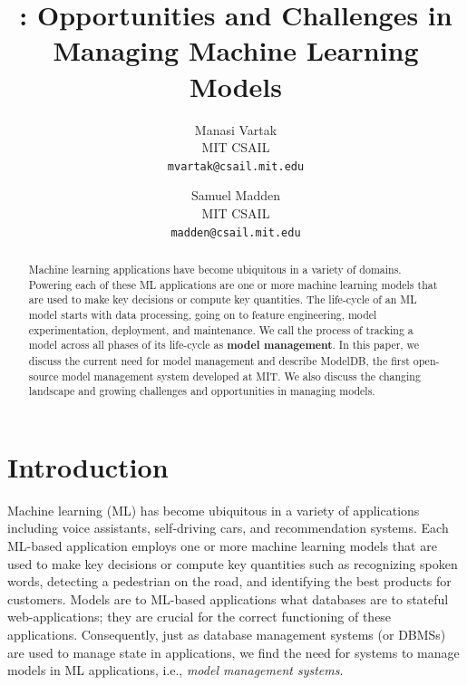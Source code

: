 \documentclass[11pt]{article}
\title{\mdb: Opportunities and Challenges in Managing Machine Learning Models}
\author{
  Manasi Vartak\\
  MIT CSAIL \\
  \texttt{mvartak@csail.mit.edu}
  \and
  Samuel Madden\\
  MIT CSAIL \\
  \texttt{madden@csail.mit.edu}
}
\newcommand{\mdb}{{\sc ModelDB}\xspace}
\begin{document}
\maketitle
\begin{abstract}
Machine learning applications have become ubiquitous in a variety of domains.
Powering each of these ML applications are one or more machine learning models that are used to make key decisions or compute key quantities.
The life-cycle of an ML model starts with data processing, going on to feature engineering, model experimentation, deployment, and maintenance.
We call the process of tracking a model across all phases of its life-cycle as {\bf model management}.
In this paper, we discuss the current need for model management and describe \mdb, the first open-source model management system developed at MIT.
We also discuss the changing landscape and growing challenges and opportunities in managing models. 
\end{abstract}
\section{Introduction}
\label{sec:model-management}

Machine learning (ML) has become ubiquitous in a variety of applications including voice assistants, self-driving cars, and recommendation systems.
Each ML-based application employs one or more machine learning models that are used to make key decisions or compute key quantities such as recognizing spoken words, detecting a pedestrian on the road, and identifying the best products for customers.
Models are to ML-based applications what databases are to stateful web-applications; they are crucial for the correct functioning of these applications.
Consequently, just as database management systems (or DBMSs) are used to manage state in applications, we find the need for systems to manage models in ML applications, i.e., {\it model management systems}.

\end{document}
